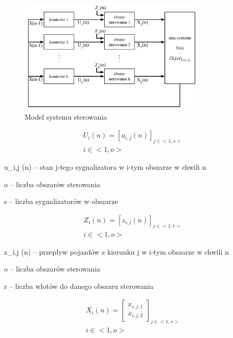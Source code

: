 \begin{figure}[h]
    \centering
    \includegraphics[width=0.8\textwidth]{images/model.pdf}
    \caption{Model systemu sterowania}
    \label{fig:model}
\end{figure}

\begin{equation}
	\begin{array}{c}
		U_i (n) = \left[ u_{i, j} (n) \right]_{j \in <1,s>}\\
		i \in <1,o>
	\end{array}
\end{equation}

u_{i,j} (n) \textrm{ -- stan j-tego sygnalizatora w i-tym obszarze w chwili n}

o -- liczba obszarów sterowania

s -- liczba sygnalizatorów w obszarze

\begin{equation}
	\begin{array}{c}
		Z_i (n) = \left[ z_{i, j} (n) \right]_{j \in <1,r>}\\
		i \in <1,o>
	\end{array}
\end{equation}

z_{i,j} (n) \textrm{ -- przepływ pojazdów z kierunku j w i-tym obszarze w chwili n}

o -- liczba obszarów sterowania

r -- liczba wlotów do danego obszaru sterowania

\begin{equation}
	\begin{array}{c}
		X_i (n) = \left[
			\begin{array}{c}
				x_{i, j, 1} \\ x_{i, j, 2}
			\end{array}
		\right]_{j \in <1,s>}\\
		i \in <1,o>
	\end{array}
\end{equation}

